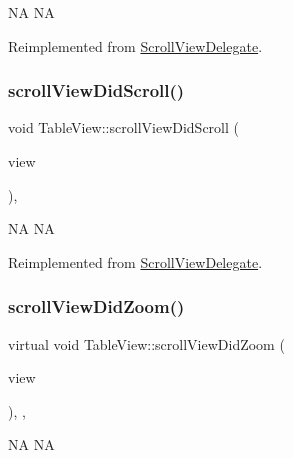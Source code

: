 NA  NA 

Reimplemented from \hyperlink{classScrollViewDelegate_acdb3346314b9769c08add984a2abe0f8}{Scroll\+View\+Delegate}.

\mbox{\label{classTableView_a021ba3adef24829362018d36f4a08621}} 
\subsubsection{\texorpdfstring{scroll\+View\+Did\+Scroll()}{scrollViewDidScroll()}\hspace{0.1cm}{\footnotesize\ttfamily [2/2]}}
{\footnotesize\ttfamily void Table\+View\+::scroll\+View\+Did\+Scroll (\begin{DoxyParamCaption}\item[{\hyperlink{classScrollView}{Scroll\+View} $\ast$}]{view }\end{DoxyParamCaption})\hspace{0.3cm}{\ttfamily [override]}, {\ttfamily [virtual]}}

NA  NA 

Reimplemented from \hyperlink{classScrollViewDelegate_acdb3346314b9769c08add984a2abe0f8}{Scroll\+View\+Delegate}.

\mbox{\label{classTableView_a5c83605ee0059fa74e9c184301cbb368}} 
\subsubsection{\texorpdfstring{scroll\+View\+Did\+Zoom()}{scrollViewDidZoom()}\hspace{0.1cm}{\footnotesize\ttfamily [1/2]}}
{\footnotesize\ttfamily virtual void Table\+View\+::scroll\+View\+Did\+Zoom (\begin{DoxyParamCaption}\item[{\hyperlink{classScrollView}{Scroll\+View} $\ast$}]{view }\end{DoxyParamCaption})\hspace{0.3cm}{\ttfamily [inline]}, {\ttfamily [override]}, {\ttfamily [virtual]}}

NA  NA 

